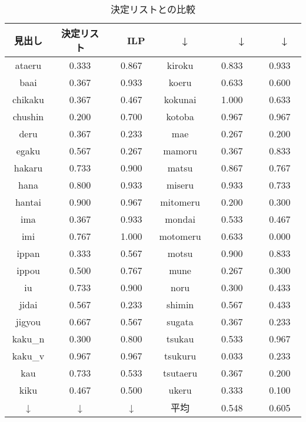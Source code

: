 \begin{table}[htbp]
  \begin{center}
    \leavevmode
    \caption{決定リストとの比較}\label{result2}
    \begin{tabular}{|c|c|c||c|c|c|} \hline
見出し　   &  決定リスト & 　ILP　  & 　↓　　 & 　　↓　　 & 　↓　　 \\ \hline
    ataeru &  0.333   &  0.867    &      kiroku & 0.833    &  0.933    \\         
      baai &  0.367   &  0.933    &       koeru & 0.633    &  0.600    \\         
   chikaku &  0.367   &  0.467    &     kokunai & 1.000    &  0.633    \\         
   chushin &  0.200   &  0.700    &      kotoba & 0.967    &  0.967    \\         
      deru &  0.367   &  0.233    &         mae & 0.267    &  0.200    \\         
     egaku &  0.567   &  0.267    &      mamoru & 0.367    &  0.833    \\         
    hakaru &  0.733   &  0.900    &       matsu & 0.867    &  0.767    \\         
      hana &  0.800   &  0.933    &      miseru & 0.933    &  0.733    \\         
    hantai &  0.900   &  0.967    &    mitomeru & 0.200    &  0.300    \\         
       ima &  0.367   &  0.933    &      mondai & 0.533    &  0.467    \\         
       imi &  0.767   &  1.000    &    motomeru & 0.633    &  0.000    \\         
     ippan &  0.333   &  0.567    &       motsu & 0.900    &  0.833    \\         
     ippou &  0.500   &  0.767    &        mune & 0.267    &  0.300    \\         
        iu &  0.733   &  0.900    &        noru & 0.300    &  0.433    \\         
     jidai &  0.567   &  0.233    &      shimin & 0.567    &  0.433    \\         
    jigyou &  0.667   &  0.567    &      sugata & 0.367    &  0.233    \\         
    kaku\_n & 0.300   &  0.800    &      tsukau & 0.533    &  0.967    \\         
    kaku\_v & 0.967   &  0.967    &     tsukuru & 0.033    &  0.233    \\         
       kau &  0.733   &  0.533    &    tsutaeru & 0.367    &  0.200    \\         
      kiku &  0.467   &  0.500    &       ukeru & 0.333    &  0.100    \\ \hline  
   ↓      &  ↓   &    ↓     &  平均       &  0.548   &  0.605     \\  \hline
    \end{tabular}
  \end{center}
\end{table}

